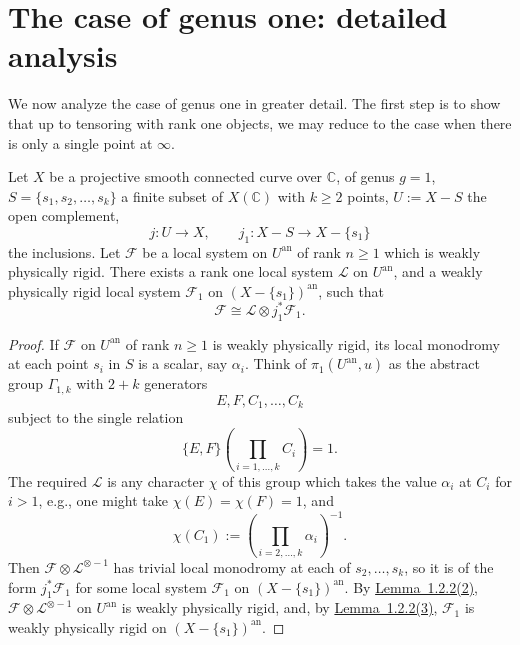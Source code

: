 \section{The case of genus one: detailed analysis}
\label{sec:1.4}

We now analyze the case of genus one in greater detail. The first step is to
show that up to tensoring with rank one objects, we may reduce to the case when
there is only a single point at \(\infty\).

\setcounter{theorem}{1}
\begin{lemma}
\label{lem:1.4.2}
Let \(X\) be a projective smooth connected curve over \(\mathbb{C}\), of genus
\(g=1\), \(S=\{s_1,s_2,\ldots,s_k\}\) a finite subset of \(X(\mathbb{C})\) with
\(k\geq 2\) points, \(U:=X-S\) the open complement,
\[
  j:U\to X,\qquad j_1:X-S\to X-\{s_1\}
\]
the inclusions. Let \(\mathcal{F}\) be a local system on \(U^{\mathrm{an}}\) of
rank \(n\geq 1\) which is weakly physically rigid. There exists a rank one local
system \(\mathcal{L}\) on \(U^{\mathrm{an}}\), and a weakly physically rigid
local system \(\mathcal{F}_1\) on \((X-\{s_1\})^{\mathrm{an}}\), such that
\[
  \mathcal{F}\cong \mathcal{L}\otimes j_1^*\mathcal{F}_1.
\]
\end{lemma}

\begin{proof}
If \(\mathcal{F}\) on \(U^{\mathrm{an}}\) of rank \(n\geq 1\) is weakly
physically rigid, its local monodromy at each point \(s_i\) in \(S\) is a
scalar, say \(\alpha_i\). Think of \(\pi_1(U^{\mathrm{an}},u)\) as the abstract
group \(\Gamma_{1,k}\) with \(2+k\) generators
\[
  E,F,C_1,\ldots,C_k
\]
subject to the single relation
\[
  \{E,F\}\left(\prod_{i=1,\ldots,k}C_i\right)=1.
\]
The required \(\mathcal{L}\) is any character \(\chi\) of this group which takes
the value \(\alpha_i\) at \(C_i\) for \(i>1\), e.g., one might take
\(\chi(E)=\chi(F)=1\), and
\[
  \chi(C_1):=\left(\prod_{i=2,\ldots,k}\alpha_i\right)^{-1}.
\]
Then \(\mathcal{F}\otimes\mathcal{L}^{\otimes -1}\) has trivial local monodromy
at each of \(s_2,\ldots,s_k\), so it is of the form \(j_1^*\mathcal{F}_1\) for
some local system \(\mathcal{F}_1\) on \((X-\{s_1\})^{\mathrm{an}}\). By
\hyperref[lem:1.2.2]{Lemma~1.2.2(2)}, \(\mathcal{F}\otimes\mathcal{L}^{\otimes -1}\) on \(U^{\mathrm{an}}\)
is weakly physically rigid, and, by \hyperref[lem:1.2.2]{Lemma~1.2.2(3)}, \(\mathcal{F}_1\) is weakly
physically rigid on \((X-\{s_1\})^{\mathrm{an}}\).
\end{proof}

